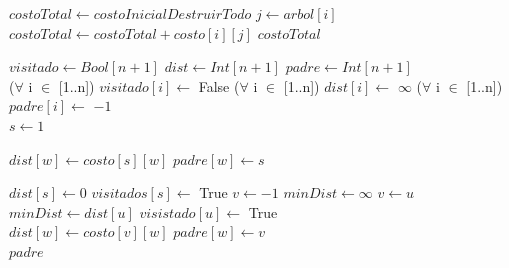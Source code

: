 \begin{algorithm}[H]
\begin{algorithmic}

    
	\State $costoTotal \gets costoInicialDestruirTodo$    
	    
		\State $j \gets arbol[i]$    
		\State $costoTotal \gets costoTotal + costo[i][j]$    
	\EndFor
	\State \Return $costoTotal$    
\EndFunction
\end{algorithmic}
\end{algorithm}


\begin{algorithm}[H]
\begin{algorithmic}
    
	\State $visitado \gets Bool[n+1]$    
	\State $dist \gets Int[n+1]$    
	\State $padre \gets Int[n+1]$     \\

	\State ($\forall$ i $\in$ [1..n]) $visitado[i] \gets$ False    
	\State ($\forall$ i $\in$ [1..n]) $dist[i] \gets$ $\infty$    
	\State ($\forall$ i $\in$ [1..n]) $padre[i] \gets$ $-1$     \\

	\State $s \gets 1$    

	    
		    
			\State $dist[w] \gets costo[s][w]$    
			\State $padre[w] \gets s$     \\
		\EndIf
	\EndFor

	\State $dist[s] \gets 0$    
	\State $visitados[s] \gets$ True    
	    
		\State $v \gets -1$    
		\State $minDist \gets \infty$    
		    
			    
				\State $v \gets u$    
				\State $minDist \gets dist[u]$    
			\EndIf
		\EndFor
		\State $visistado[u] \gets$ True     \\

		    
			    
				\State $dist[w] \gets costo[v][w]$    
				\State $padre[w] \gets v$     \\
			\EndIf
		\EndFor
	\EndFor
	\State \Return $padre$    
\EndFunction
\end{algorithmic}
\end{algorithm}

